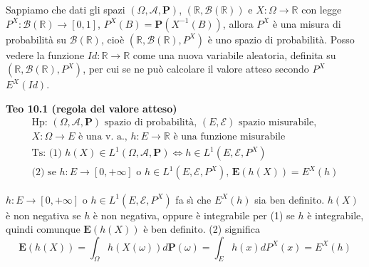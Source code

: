 \documentclass{article}
\begin{document}
Sappiamo che dati gli spazi $\left( \Omega ,\mathcal{A},\mathbf{P}\right) $, 
$\left( 
\mathbb{R}
,\mathcal{B}\left( 
\mathbb{R}
\right) \right) $ e $X:\Omega \rightarrow 
\mathbb{R}
$ con legge $P^{X}:\mathcal{B}\left( 
\mathbb{R}
\right) \rightarrow \left[ 0,1\right] $, $P^{X}\left( B\right) =\mathbf{P}%
\left( X^{-1}\left( B\right) \right) $, allora $P^{X}$ \`{e} una misura di
probabilit\`{a} su $\mathcal{B}\left( 
\mathbb{R}
\right) $, cio\`{e} $\left( 
\mathbb{R}
,\mathcal{B}\left( 
\mathbb{R}
\right) ,P^{X}\right) $ \`{e} uno spazio di probabilit\`{a}. Posso vedere la
funzione $Id:%
\mathbb{R}
\rightarrow 
\mathbb{R}
$ come una nuova variabile aleatoria, definita su $\left( 
\mathbb{R}
,\mathcal{B}\left( 
\mathbb{R}
\right) ,P^{X}\right) $, per cui se ne pu\`{o} calcolare il valore atteso
secondo $P^{X}$ $E^{X}\left( Id\right) $.

\textbf{Teo 10.1 (regola del valore atteso)}%
\begin{gather*}
\text{Hp: }\left( \Omega ,\mathcal{A},\mathbf{P}\right) \text{ spazio di
probabilit\`{a}, }\left( E,\mathcal{E}\right) \text{ spazio misurabile, } \\
X:\Omega \rightarrow E\text{ \`{e} una v. a., }h:E\rightarrow 
\mathbb{R}
\text{ \`{e} una funzione misurabile} \\
\text{Ts: (1) }h\left( X\right) \in L^{1}\left( \Omega ,\mathcal{A},\mathbf{P%
}\right) \Longleftrightarrow h\in L^{1}\left( E,\mathcal{E},P^{X}\right) \\
\text{(2) se }h:E\rightarrow \left[ 0,+\infty \right] \text{ o }h\in
L^{1}\left( E,\mathcal{E},P^{X}\right) \text{, }\mathbf{E}\left( h\left(
X\right) \right) =E^{X}\left( h\right)
\end{gather*}

$h:E\rightarrow \left[ 0,+\infty \right] $ o $h\in L^{1}\left( E,\mathcal{E}%
,P^{X}\right) $ fa s\`{\i} che $E^{X}\left( h\right) $ sia ben definito. $%
h\left( X\right) $ \`{e} non negativa se $h$ \`{e} non negativa, oppure \`{e}
integrabile per (1) se $h$ \`{e} integrabile, quindi comunque $\mathbf{E}%
\left( h\left( X\right) \right) $ \`{e} ben definito. (2) significa%
\begin{equation*}
\mathbf{E}\left( h\left( X\right) \right) =\int_{\Omega }h\left( X\left(
\omega \right) \right) d\mathbf{P}\left( \omega \right) =\int_{E}h\left(
x\right) dP^{X}\left( x\right) =E^{X}\left( h\right)
\end{equation*}
\end{document}
